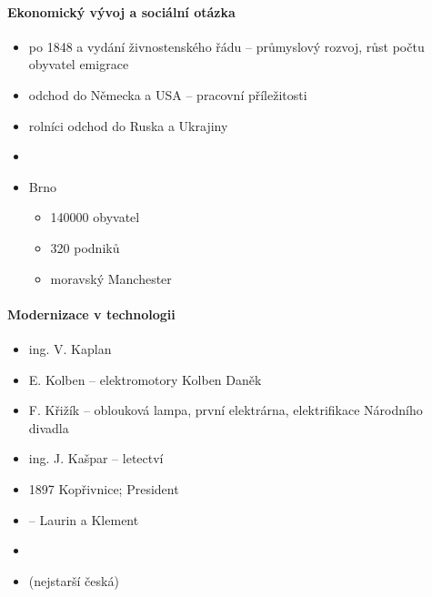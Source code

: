 \paragraph{Ekonomický vývoj a sociální otázka}
\begin{itemize}
\item po 1848 a vydání živnostenského řádu -- průmyslový rozvoj, růst počtu obyvatel \ra emigrace
\item odchod do Německa a USA -- pracovní příležitosti
\item rolníci odchod do Ruska a Ukrajiny
\item {}
\item Brno
	\begin{itemize}
	\item 140000 obyvatel
	\item	320 podniků
\item moravský Manchester
	\end{itemize}
\end{itemize}

\paragraph{Modernizace v technologii}
\begin{itemize}
\item ing. V. Kaplan 
\item E. Kolben -- elektromotory Kolben Daněk
\item F. Křižík -- oblouková lampa, první elektrárna, elektrifikace Národního divadla
\item ing. J. Kašpar -- letectví
\item 1897 Kopřivnice; President
\item {} -- Laurin a Klement
\item {}
\item {} (nejstarší česká) 
\end{itemize}

